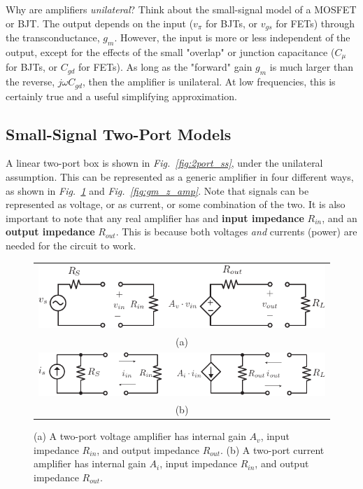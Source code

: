 Why are amplifiers \textit{unilateral}?  Think about the small-signal model of a MOSFET or BJT.  The output depends on the input ($v_{\pi}$ for BJTs, or $v_{gs}$ for FETs) through the transconductance, $g_m$.  However, the input is more or less independent of the output, except for the effects of the small "overlap" or junction capacitance ($C_\mu$ for BJTs, or $C_{gd}$ for FETs).  As long as the "forward" gain $g_m$ is much larger than the reverse, $j\omega C_{gd}$, then the amplifier is unilateral.  At low frequencies, this is certainly true and a useful simplifying approximation.
\subsection{Small-Signal Two-Port Models}
A linear two-port box is shown in \emph{Fig.~\ref{fig:2port_ss}}, under the unilateral assumption.  This can be represented as a generic amplifier in four different ways, as shown in \emph{Fig.~\ref{fig:vi_amp}} and \emph{Fig.~\ref{fig:gm_z_amp}}.  Note that signals can be represented as voltage, or as current, or some combination of the two.  It is also important to note that any real amplifier has and \textbf{input impedance} $R_{in}$, and an \textbf{output impedance} $R_{out}$.  This is because both voltages \textit{and} currents (power) are needed for the circuit to work.
\newpage
\begin{figure}[tb]
\centering
\begin{tabular}{c}
\includegraphics[width=.9\columnwidth]{vamp_label}\\
(a)\\
\includegraphics[width=.9\columnwidth]{iamp}\\
(b)\\
\end{tabular}
\caption{(a) A two-port voltage amplifier has internal gain $A_v$, input impedance $R_{in}$, and output impedance $R_{out}$.  (b) A two-port current amplifier has internal gain $A_i$, input impedance $R_{in}$, and output impedance $R_{out}$.}
\label{fig:vi_amp}
\end{figure}
